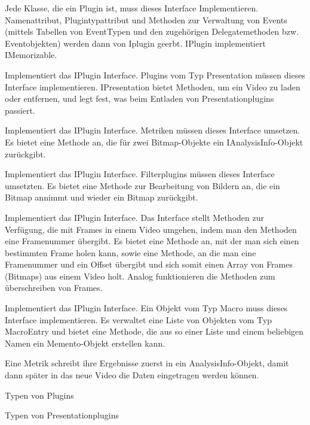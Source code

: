 Jede Klasse, die ein Plugin ist, muss dieses Interface Implementieren. Namenattribut, Plugintypattribut und Methoden zur Verwaltung von Events (mittels Tabellen von EventTypen und den zugehörigen Delegatemethoden bzw. Eventobjekten) werden dann von Iplugin geerbt. IPlugin implementiert IMemorizable.


Implementiert das IPlugin Interface. Plugins vom Typ Presentation müssen dieses Interface implementieren. IPresentation bietet Methoden, um ein Video zu laden oder entfernen, und legt fest, was beim Entladen von Presentationplugins passiert.


Implementiert das IPlugin Interface. Metriken müssen dieses Interface umsetzen. Es bietet eine Methode an, die für zwei Bitmap-Objekte ein IAnalysisInfo-Objekt zurückgibt.


Implementiert das IPlugin Interface. Filterplugins müssen dieses Interface umsetzten. Es bietet eine Methode zur Bearbeitung von Bildern an, die ein Bitmap annimmt und wieder ein Bitmap zurückgibt.


Implementiert das IPlugin Interface. Das Interface stellt Methoden zur Verfügung, die mit Frames in einem Video umgehen, indem man den Methoden eine Framenummer übergibt. Es bietet eine Methode an, mit der man sich einen bestimmten Frame holen kann, sowie eine Methode, an die man eine Framenummer und ein Offset übergibt und sich somit einen Array von Frames (Bitmaps) aus einem Video holt. Analog funktionieren die Methoden zum überschreiben von Frames.


Implementiert das IPlugin Interface. Ein Objekt vom Typ Macro muss dieses Interface implementieren. Es verwaltet eine Liste von Objekten vom Typ MacroEntry und bietet eine Methode, die aus so einer Liste und einem beliebigen Namen ein Memento-Objekt erstellen kann.








Eine Metrik schreibt ihre Ergebnisse zuerst in ein AnalysisInfo-Objekt, damit dann später in das neue Video die Daten eingetragen werden können.


Typen von Plugins


Typen von Presentationplugins


